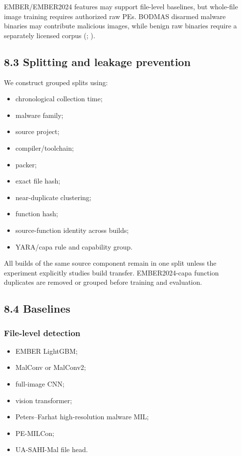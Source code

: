 \documentclass[
  10pt,
]{article}
\providecommand{\tightlist}{%
  \setlength{\itemsep}{0pt}\setlength{\parskip}{0pt}}
\begin{document}
EMBER/EMBER2024 features may support file-level baselines, but
whole-file image training requires authorized raw PEs. BODMAS disarmed
malware binaries may contribute malicious images, while benign raw
binaries require a separately licensed corpus
(;
).

\subsection{8.3 Splitting and leakage
prevention}\label{splitting-and-leakage-prevention}

We construct grouped splits using:

\begin{itemize}
\tightlist
\item
  chronological collection time;
\item
  malware family;
\item
  source project;
\item
  compiler/toolchain;
\item
  packer;
\item
  exact file hash;
\item
  near-duplicate clustering;
\item
  function hash;
\item
  source-function identity across builds;
\item
  YARA/capa rule and capability group.
\end{itemize}

All builds of the same source component remain in one split unless the
experiment explicitly studies build transfer. EMBER2024-capa function
duplicates are removed or grouped before training and evaluation.

\subsection{8.4 Baselines}\label{baselines}

\subsubsection{File-level detection}\label{file-level-detection}

\begin{itemize}
\tightlist
\item
  EMBER LightGBM;
\item
  MalConv or MalConv2;
\item
  full-image CNN;
\item
  vision transformer;
\item
  Peters--Farhat high-resolution malware MIL;
\item
  PE-MILCon;
\item
  UA-SAHI-Mal file head.
\end{itemize}
\end{document}
